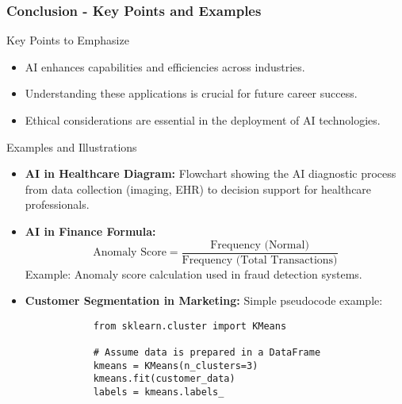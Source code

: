 \documentclass{beamer}
\begin{document}
\begin{frame}[fragile]
    \frametitle{Conclusion - Key Points and Examples}
    \begin{block}{Key Points to Emphasize}
        \begin{itemize}
            \item AI enhances capabilities and efficiencies across industries.
            \item Understanding these applications is crucial for future career success.
            \item Ethical considerations are essential in the deployment of AI technologies.
        \end{itemize}
    \end{block}

    \begin{block}{Examples and Illustrations}
        \begin{itemize}
            \item \textbf{AI in Healthcare Diagram:} Flowchart showing the AI diagnostic process from data collection (imaging, EHR) to decision support for healthcare professionals.
            \item \textbf{AI in Finance Formula:} 
            \begin{equation}
                \text{Anomaly Score} = \dfrac{\text{Frequency (Normal)}}{\text{Frequency (Total Transactions)}}
            \end{equation}
            Example: Anomaly score calculation used in fraud detection systems.
            \item \textbf{Customer Segmentation in Marketing:} 
            Simple pseudocode example:
            \begin{lstlisting}
            from sklearn.cluster import KMeans

            # Assume data is prepared in a DataFrame
            kmeans = KMeans(n_clusters=3)
            kmeans.fit(customer_data)
            labels = kmeans.labels_
            \end{lstlisting}
        \end{itemize}
    \end{block}
\end{frame}
\end{document}

